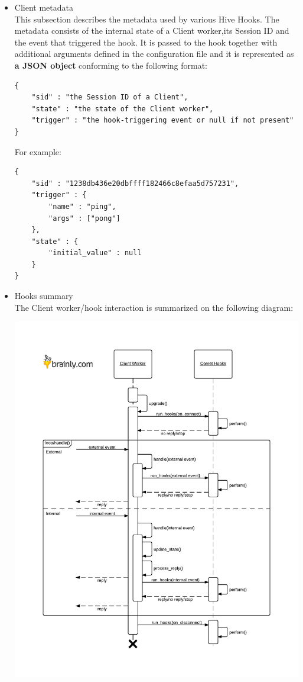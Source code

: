 \documentclass[a4paper]{article}
\begin{document}
\begin{itemize}
\item Client metadata\\
\label{sec-7-1-4-2}%
This subsection describes the metadata used by various Hive Hooks. The metadata consists of the internal state of a Client worker,its Session ID and the event that triggered the hook. It is passed to the hook together with additional arguments defined in the configuration file and it is represented as \textbf{a JSON object} conforming to the following format:


\begin{verbatim}
{
    "sid" : "the Session ID of a Client",
    "state" : "the state of the Client worker",
    "trigger" : "the hook-triggering event or null if not present"
}
\end{verbatim}




\noindent
For example:


\begin{verbatim}
{
    "sid" : "1238db436e20dbffff182466c8efaa5d757231",
    "trigger" : {
        "name" : "ping",
        "args" : ["pong"]
    },
    "state" : {
        "initial_value" : null
    }
}
\end{verbatim}





\item Hooks summary\\
\label{sec-7-1-4-3}%
The Client worker/hook interaction is summarized on the following diagram:

\begin{center}
\includegraphics[scale=0.9]{./img/client_hooks.pdf}
\end{center}


\end{itemize}
\end{document}
